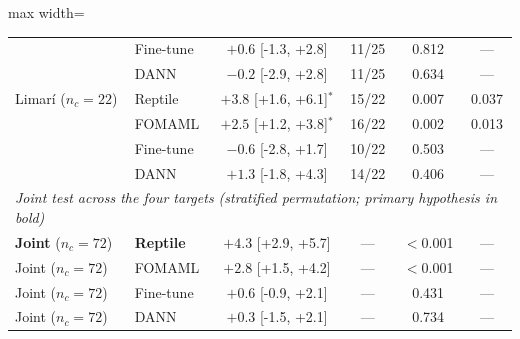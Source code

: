 \begin{table}[ht]
\begin{adjustbox}{max width=\textwidth}
\begin{tabular}{llcccc}
         & Fine-tune & $+0.6$ [-1.3, +2.8] & 11/25 & 0.812 & --- \\
         & DANN & $-0.2$ [-2.9, +2.8] & 11/25 & 0.634 & --- \\
        \midrule
        Limar\'i ($n_c=22$) & Reptile & $+3.8$ [+1.6, +6.1]$^{*}$ & 15/22 & 0.007 & 0.037 \\
         & FOMAML & $+2.5$ [+1.2, +3.8]$^{*}$ & 16/22 & 0.002 & 0.013 \\
         & Fine-tune & $-0.6$ [-2.8, +1.7] & 10/22 & 0.503 & --- \\
         & DANN & $+1.3$ [-1.8, +4.3] & 14/22 & 0.406 & --- \\
        \midrule
        \multicolumn{6}{l}{\textit{Joint test across the four targets (stratified permutation; primary hypothesis in bold)}} \\
        \textbf{Joint} ($n_c=72$) & \textbf{Reptile} & $+4.3$ [+2.9, +5.7] & --- & $<$0.001 & --- \\
        Joint ($n_c=72$) & FOMAML & $+2.8$ [+1.5, +4.2] & --- & $<$0.001 & --- \\
        Joint ($n_c=72$) & Fine-tune & $+0.6$ [-0.9, +2.1] & --- & 0.431 & --- \\
        Joint ($n_c=72$) & DANN & $+0.3$ [-1.5, +2.1] & --- & 0.734 & --- \\
        \bottomrule
    \end{tabular}
    \end{adjustbox}
\end{table}
